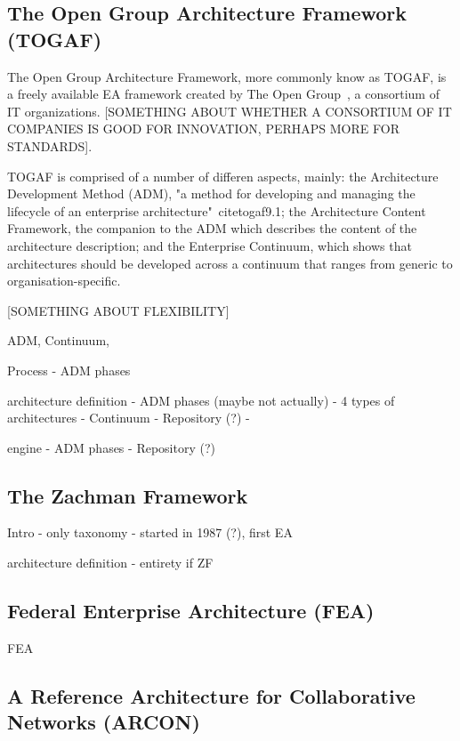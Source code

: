 
\subsection{The Open Group Architecture Framework (TOGAF)}
The Open Group Architecture Framework, more commonly know as TOGAF, is a freely available EA framework created by The Open Group~\cite{togaf9.1}, a consortium of IT organizations. [SOMETHING ABOUT WHETHER A CONSORTIUM OF IT COMPANIES IS GOOD FOR INNOVATION, PERHAPS MORE FOR STANDARDS]. 

TOGAF is comprised of a number of differen aspects, mainly: the Architecture Development Method (ADM), "a method for developing and managing the lifecycle of an enterprise
architecture"~cite{togaf9.1}; the Architecture Content Framework, the companion to the ADM which describes the content of the architecture description; and the Enterprise Continuum, which shows that architectures should be developed across a continuum that ranges from generic to organisation-specific. 

[SOMETHING ABOUT FLEXIBILITY]

ADM, Continuum,  \cite{lankhorst2009}

Process
- ADM phases

architecture definition
- ADM phases (maybe not actually)
- 4 types of architectures
- Continuum
- Repository (?)
- 

engine
- ADM phases
- Repository (?)


\subsection{The Zachman Framework}
Intro
- only taxonomy
- started in 1987 (?), first EA

architecture definition
- entirety if ZF

\subsection{Federal Enterprise Architecture (FEA)}
FEA

\subsection{A Reference Architecture for Collaborative Networks (ARCON)}
